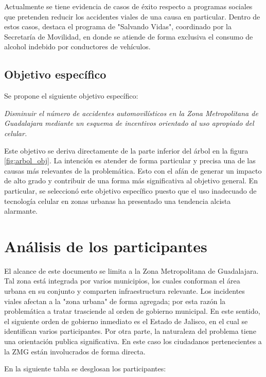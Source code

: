 \documentclass{article}
\newcommand{\forceindent}{\leavevmode{\parindent=1em\indent}}
\begin{document}
Actualmente se tiene evidencia de casos de éxito respecto a programas sociales que pretenden reducir los accidentes viales de una causa en particular. Dentro de estos casos, destaca el programa de "Salvando Vidas", coordinado por la Secretaría de Movilidad, en donde se atiende de forma exclusiva el consumo de alcohol indebido por conductores de vehículos.

\subsection{Objetivo específico}\label{subsec:specific-objs}

Se propone el siguiente objetivo específico:

\forceindent \textit{Disminuir el número de accidentes automovilísticos en la Zona Metropolitana de Guadalajara mediante un esquema de incentivos orientado al uso apropiado del celular.}

Este objetivo se deriva directamente de la parte inferior del árbol en la figura \ref{fig:arbol_obj}. La intención es atender de forma particular y precisa una de las causas más relevantes de la problemática. Esto con el afán de generar un impacto de alto grado y contribuir de una forma más significativa al objetivo general. En particular, se seleccionó este objetivo específico puesto que el uso inadecuado de tecnología celular en zonas urbanas ha presentado una tendencia alcista alarmante.


\newpage
\section{Análisis de los participantes}\label{sec:participants}

El alcance de este documento se limita a la Zona Metropolitana de Guadalajara. Tal zona está integrada por varios municipios, los cuales conforman el área urbana en su conjunto y comparten infraestructura relevante. Los incidentes viales afectan a la "zona urbana" de forma agregada; por esta razón la problemática a tratar trasciende al orden de gobierno municipal. En este sentido, el siguiente orden de gobierno inmediato es el Estado de Jalisco, en el cual se identifican varios participantes. Por otra parte, la naturaleza del problema tiene una orientación publica significativa. En este caso los ciudadanos pertenecientes a la ZMG están involucrados de forma directa. 

En la siguiente tabla se desglosan los participantes:
\end{document}
